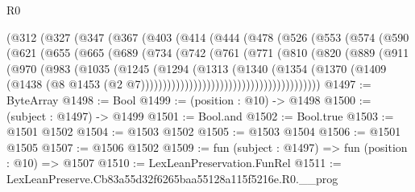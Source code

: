 \begin{lexlean}{R0}
\begin{coremodule}
            (@312
              (@327
                (@347
                  (@367
                    (@403
                      (@414
                        (@444
                          (@478
                            (@526
                              (@553
                                (@574
                                  (@590
                                    (@621
                                      (@655
                                        (@665
                                          (@689
                                            (@734
                                              (@742
                                                (@761
                                                  (@771
                                                    (@810
                                                      (@820
                                                        (@889
                                                          (@911
                                                            (@970
                                                              (@983
                                                                (@1035
                                                                  (@1245
                                                                    (@1294
                                                                      (@1313
                                                                        (@1340
                                                                          (@1354
                                                                            (@1370
                                                                              (@1409
                                                                                (@1438
                                                                                  (@8
                                                                                    @1453
                                                                                    (@2
                                                                                      @7)))))))))))))))))))))))))))))))))))))))))
@1497 := ByteArray
@1498 := Bool
@1499 := (position : @10) -> @1498
@1500 := (subject : @1497) -> @1499
@1501 := Bool.and
@1502 := Bool.true
@1503 := @1501 @1502
@1504 := @1503 @1502
@1505 := @1503 @1504
@1506 := @1501 @1505
@1507 := @1506 @1502
@1509 := fun (subject : @1497) => fun (position : @10) => @1507
@1510 := LexLeanPreservation.FunRel
@1511 := LexLeanPreserve.Cb83a55d32f6265baa55128a115f5216e.R0.__prog

\end{coremodule}
\end{lexlean}
